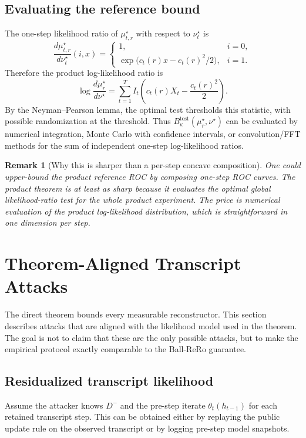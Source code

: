 \documentclass[conference,compsoc]{IEEEtran}
\newtheorem{remark}{Remark}
\begin{document}
\subsection{Evaluating the reference bound}

The one-step likelihood ratio of $\mu_{t,r}^\star$ with respect to $\nu_t^\star$ is
\[
\frac{d\mu_{t,r}^\star}{d\nu_t^\star}(i,x)
=
\begin{cases}
1, & i=0,\\[0.5ex]
\exp\bigl(c_t(r)x-c_t(r)^2/2\bigr), & i=1.
\end{cases}
\]
Therefore the product log-likelihood ratio is
\[
\log\frac{d\mu_r^\star}{d\nu^\star}
=
\sum_{t=1}^T I_t\left(c_t(r)X_t-\frac{c_t(r)^2}{2}\right).
\]
By the Neyman--Pearson lemma, the optimal test thresholds this statistic, with possible randomization at the threshold. Thus $B_\kappa^{\mathrm{test}}(\mu_r^\star,\nu^\star)$ can be evaluated by numerical integration, Monte Carlo with confidence intervals, or convolution/FFT methods for the sum of independent one-step log-likelihood ratios.

\begin{remark}[Why this is sharper than a per-step concave composition]
One could upper-bound the product reference ROC by composing one-step ROC curves. The product theorem is at least as sharp because it evaluates the optimal global likelihood-ratio test for the whole product experiment. The price is numerical evaluation of the product log-likelihood distribution, which is straightforward in one dimension per step.
\end{remark}

\section{Theorem-Aligned Transcript Attacks}
\label{sec:attacks}

The direct theorem bounds every measurable reconstructor. This section describes attacks that are aligned with the likelihood model used in the theorem. The goal is not to claim that these are the only possible attacks, but to make the empirical protocol exactly comparable to the Ball-ReRo guarantee.

\subsection{Residualized transcript likelihood}

Assume the attacker knows $D^-$ and the pre-step iterate $\theta_t(h_{t-1})$ for each retained transcript step. This can be obtained either by replaying the public update rule on the observed transcript or by logging pre-step model snapshots.
\end{document}
